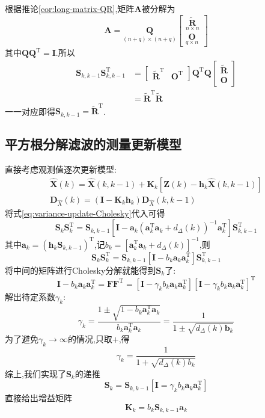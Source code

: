 \documentclass[cn,10pt,citestyle=gb7714-2015,bibstyle=gb7714-2015]{elegantbook}
\newcommand{\mT}{\mathrm{T}}
\begin{document}
根据推论\ref{cor:long-matrix-QR},矩阵$\bm{A}$被分解为
\[
  \bm{A}=\underset{(n+q)\times(n+q)}{\bm{Q}}\begin{bmatrix}
    \underset{n\times n}{\widetilde{\bm{R}}}\\
    \underset{q\times n}{\bm{O}}
  \end{bmatrix}
\]
其中$\bm{Q}\bm{Q}^\mT=\bm{I}$.所以
\begin{align*}
  \bm{S}_{k,k-1}\bm{S}_{k,k-1}^\mT&=\begin{bmatrix}
    \widetilde{\bm{R}}^\mT&\bm{O}^\mT
  \end{bmatrix}\bm{Q}^\mT\bm{Q}\begin{bmatrix}
    \widetilde{\bm{R}}\\
    \bm{O}
  \end{bmatrix}\\
  &=\widetilde{\bm{R}}^\mT\widetilde{\bm{R}}
\end{align*}
一一对应即得$\bm{S}_{k,k-1}=\widetilde{\bm{R}}^\mT$.
\subsection{平方根分解滤波的测量更新模型}
直接考虑观测值逐次更新模型:
\begin{gather*}
  \hat{\bm{X}}(k)=\hat{\bm{X}}(k,k-1)+\bm{K}_k[\bm{Z}(k)-\bm{h}_k\hat{\bm{X}}(k,k-1)]\\
  \bm{D}_{\hat{X}}(k)=(\bm{I}-\bm{K}_k\bm{h}_k)\bm{D}_{\hat{X}}(k,k-1)
\end{gather*}
将式\eqref{eq:variance-update-Cholesky}代入可得
\begin{equation}
  \bm{S}_k\bm{S}_k^\mT=\bm{S}_{k,k-1}\left[\bm{I}-\bm{a}_k(\bm{a}_k^\mT\bm{a}_k+d_\varDelta(k))^{-1}\bm{a}_k^\mT\right]\bm{S}_{k,k-1}^\mT
\end{equation}
其中$\bm{a}_k=(\bm{h}_k\bm{S}_{k,k-1})^\mT$,记$b_k=\left[\bm{a}_k^\mT\bm{a}_k+d_\varDelta(k)\right]^{-1}$,则
\begin{equation}
  \bm{S}_k\bm{S}_k^\mT=\bm{S}_{k,k-1}\left[\bm{I}-b_k\bm{a}_k\bm{a}_k^\mT\right]\bm{S}_{k,k-1}^\mT
\end{equation}
将中间的矩阵进行Cholesky分解就能得到$\bm{S}_k$了:
\begin{equation}
  \bm{I}-b_k\bm{a}_k\bm{a}_k^\mT=\bm{F}\bm{F}^\mT=[\bm{I}-\gamma_kb_k\bm{a}_k\bm{a}_k^\mT][\bm{I}-\gamma_kb_k\bm{a}_k\bm{a}_k^\mT]^\mT
\end{equation}
解出待定系数$\gamma_k$:
\begin{equation}
  \gamma_k=\frac{1\pm\sqrt{1-b_k\bm{a}_k^\mT\bm{a}_k}}{b_k\bm{a}_k^\mT\bm{a}_k}=\frac{1}{1\pm\sqrt{d_\varDelta(k)\bm{b}_k}}
\end{equation}
为了避免$\gamma_k\to\infty$的情况,只取$+$,得
\begin{equation}
  \boxed{\gamma_k=\frac{1}{1+\sqrt{d_\varDelta(k)b_k}}}
\end{equation}
综上,我们实现了$\bm{S}_k$的递推
\begin{equation}
  \bm{S}_k=\bm{S}_{k,k-1}\left[\bm{I}=\gamma_kb_k\bm{a}_k\bm{a}_k^\mT\right]
\end{equation}
直接给出增益矩阵
\begin{equation}
  \bm{K}_k=b_k\bm{S}_{k,k-1}\bm{a}_k
\end{equation}
\end{document}
